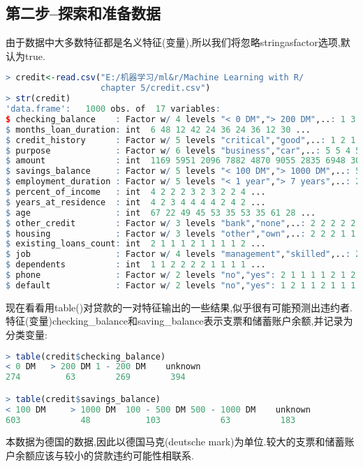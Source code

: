 \documentclass[11pt,a4paper,oneside]{book}
\begin{document}
\subsection{第二步--探索和准备数据}
由于数据中大多数特征都是名义特征(变量),所以我们将忽略stringasfactor选项,默认为true.
\begin{lstlisting}[language=r]
> credit<-read.csv("E:/机器学习/ml&r/Machine Learning with R/
                   chapter 5/credit.csv")
> str(credit)
'data.frame':	1000 obs. of  17 variables:
$ checking_balance    : Factor w/ 4 levels "< 0 DM","> 200 DM",..: 1 3 4 1 1 4 4 3 4 3 ...
$ months_loan_duration: int  6 48 12 42 24 36 24 36 12 30 ...
$ credit_history      : Factor w/ 5 levels "critical","good",..: 1 2 1 2 4 2 2 2 2 1 ...
$ purpose             : Factor w/ 6 levels "business","car",..: 5 5 4 5 2 4 5 2 5 2 ...
$ amount              : int  1169 5951 2096 7882 4870 9055 2835 6948 3059 5234 ...
$ savings_balance     : Factor w/ 5 levels "< 100 DM","> 1000 DM",..: 5 1 1 1 1 5 4 1 2 1 ...
$ employment_duration : Factor w/ 5 levels "< 1 year","> 7 years",..: 2 3 4 4 3 3 2 3 4 5 ...
$ percent_of_income   : int  4 2 2 2 3 2 3 2 2 4 ...
$ years_at_residence  : int  4 2 3 4 4 4 4 2 4 2 ...
$ age                 : int  67 22 49 45 53 35 53 35 61 28 ...
$ other_credit        : Factor w/ 3 levels "bank","none",..: 2 2 2 2 2 2 2 2 2 2 ...
$ housing             : Factor w/ 3 levels "other","own",..: 2 2 2 1 1 1 2 3 2 2 ...
$ existing_loans_count: int  2 1 1 1 2 1 1 1 1 2 ...
$ job                 : Factor w/ 4 levels "management","skilled",..: 2 2 4 2 2 4 2 1 4 1 ...
$ dependents          : int  1 1 2 2 2 2 1 1 1 1 ...
$ phone               : Factor w/ 2 levels "no","yes": 2 1 1 1 1 2 1 2 1 1 ...
$ default             : Factor w/ 2 levels "no","yes": 1 2 1 1 2 1 1 1 1 2 ...
\end{lstlisting}

现在看看用table()对贷款的一对特征输出的一些结果,似乎很有可能预测出违约者.特征(变量)checking\_balance和saving\_balance表示支票和储蓄账户余额,并记录为分类变量:
\begin{lstlisting}[language=r]
> table(credit$checking_balance)
< 0 DM   > 200 DM 1 - 200 DM    unknown 
274         63        269        394 

> table(credit$savings_balance)
< 100 DM     > 1000 DM  100 - 500 DM 500 - 1000 DM    unknown 
603            48           103            63          183 
\end{lstlisting}
本数据为德国的数据,因此以德国马克(deutsche mark)为单位.较大的支票和储蓄账户余额应该与较小的贷款违约可能性相联系.
\end{document}
